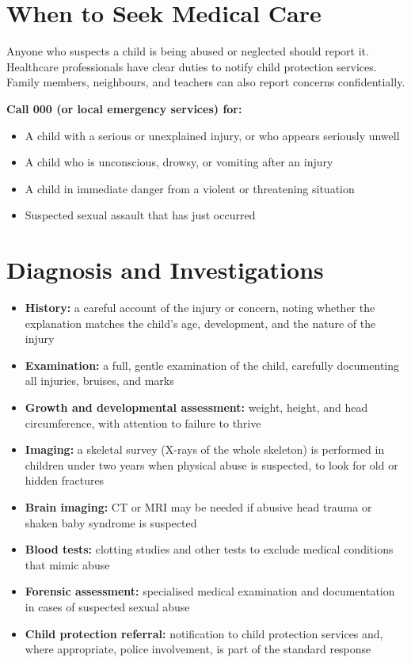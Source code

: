 \section*{When to Seek Medical Care}
Anyone who suspects a child is being abused or neglected should report it. Healthcare professionals have clear duties to notify child protection services. Family members, neighbours, and teachers can also report concerns confidentially.

\medskip
\textbf{Call 000 (or local emergency services) for:}
\begin{itemize}
    \item A child with a serious or unexplained injury, or who appears seriously unwell
    \item A child who is unconscious, drowsy, or vomiting after an injury
    \item A child in immediate danger from a violent or threatening situation
    \item Suspected sexual assault that has just occurred
\end{itemize}

\section*{Diagnosis and Investigations}
\begin{itemize}
    \item \textbf{History:} a careful account of the injury or concern, noting whether the explanation matches the child's age, development, and the nature of the injury
    \item \textbf{Examination:} a full, gentle examination of the child, carefully documenting all injuries, bruises, and marks
    \item \textbf{Growth and developmental assessment:} weight, height, and head circumference, with attention to failure to thrive
    \item \textbf{Imaging:} a skeletal survey (X-rays of the whole skeleton) is performed in children under two years when physical abuse is suspected, to look for old or hidden fractures
    \item \textbf{Brain imaging:} CT or MRI may be needed if abusive head trauma or shaken baby syndrome is suspected
    \item \textbf{Blood tests:} clotting studies and other tests to exclude medical conditions that mimic abuse
    \item \textbf{Forensic assessment:} specialised medical examination and documentation in cases of suspected sexual abuse
    \item \textbf{Child protection referral:} notification to child protection services and, where appropriate, police involvement, is part of the standard response
\end{itemize}

